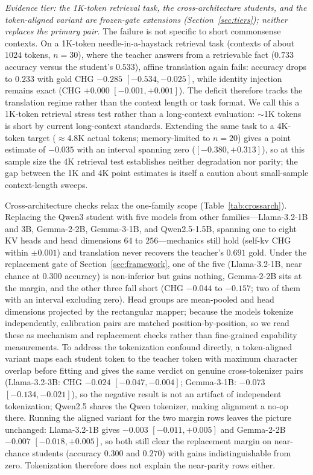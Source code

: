 \documentclass{article} %
\begin{document}
\emph{Evidence tier: the 1K-token retrieval task, the cross-architecture students, and
the token-aligned variant are frozen-gate extensions (Section~\ref{sec:tiers});
neither replaces the primary pair.}
The failure is not specific to short commonsense contexts. On a 1K-token
needle-in-a-haystack retrieval task (contexts of about $1024$ tokens,
$n{=}30$), where the teacher answers from a retrievable fact ($0.733$ accuracy
versus the student's $0.533$), affine translation again fails: accuracy drops
to $0.233$ with gold CHG $-0.285$ $[-0.534, -0.025]$, while identity injection
remains exact (CHG $+0.000$ $[-0.001, +0.001]$). The deficit therefore tracks
the translation regime rather than the context length or task format. We call
this a 1K-token retrieval stress test rather than a long-context evaluation:
$\sim$1K tokens is short by current long-context standards. Extending the same
task to a 4K-token target ($\approx$4.8K actual tokens; memory-limited to
$n{=}20$) gives a point estimate of
$-0.035$ with an interval spanning zero ($[-0.380, +0.313]$), so at this sample
size the 4K retrieval test establishes neither degradation nor parity; the gap
between the 1K and 4K point estimates is itself a caution about small-sample
context-length sweeps.

Cross-architecture checks relax the one-family scope
(Table~\ref{tab:crossarch}). Replacing the Qwen3 student with five models from
other families---Llama-3.2-1B and 3B, Gemma-2-2B, Gemma-3-1B, and
Qwen2.5-1.5B, spanning one to eight KV heads and head dimensions $64$ to
$256$---mechanics still hold (self-kv CHG within $\pm0.001$) and translation
never recovers the teacher's $0.691$ gold. Under the replacement gate of
Section~\ref{sec:framework}, one of the five (Llama-3.2-1B, near chance at
$0.300$ accuracy) is non-inferior but gains nothing, Gemma-2-2B sits at the
margin, and the other three fall short (CHG $-0.044$ to $-0.157$; two of them
with an interval excluding zero). Head groups are mean-pooled and head
dimensions projected by the rectangular mapper; because the models tokenize
independently, calibration pairs are matched position-by-position, so we read
these as mechanism and replacement checks rather than fine-grained capability
measurements. To address the tokenization confound directly, a token-aligned
variant maps each student token to the teacher token with maximum character
overlap before fitting and gives the same verdict on genuine cross-tokenizer
pairs (Llama-3.2-3B: CHG $-0.024$ $[-0.047,-0.004]$; Gemma-3-1B: $-0.073$
$[-0.134,-0.021]$), so the negative result is not an artifact of independent
tokenization; Qwen2.5 shares the Qwen tokenizer, making alignment a no-op
there. Running the aligned variant for the two margin rows leaves the picture
unchanged: Llama-3.2-1B gives $-0.003$ $[-0.011,+0.005]$ and Gemma-2-2B
$-0.007$ $[-0.018,+0.005]$, so both still clear the replacement margin on
near-chance students (accuracy $0.300$ and $0.270$) with gains indistinguishable
from zero. Tokenization therefore does not explain the near-parity rows either.
\end{document}
